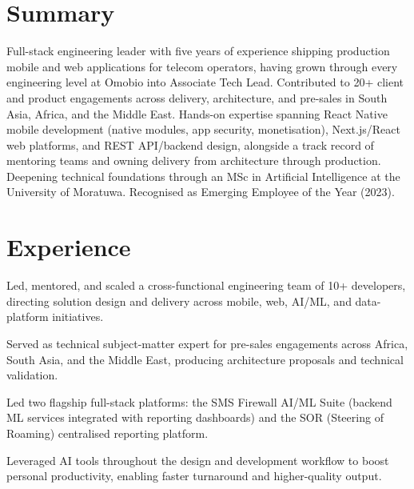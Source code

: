 \documentclass[10.5pt]{article}
\begin{document}

\section*{Summary}
Full-stack engineering leader with five years of experience shipping production mobile and web applications for telecom operators, having grown through every engineering level at Omobio into Associate Tech Lead. Contributed to 20+ client and product engagements across delivery, architecture, and pre-sales in South Asia, Africa, and the Middle East. Hands-on expertise spanning React Native mobile development (native modules, app security, monetisation), Next.js/React web platforms, and REST API/backend design, alongside a track record of mentoring teams and owning delivery from architecture through production. Deepening technical foundations through an MSc in Artificial Intelligence at the University of Moratuwa. Recognised as Emerging Employee of the Year (2023).

\section*{Experience}

\begin{cvitems}
  \item Led, mentored, and scaled a cross-functional engineering team of 10+ developers, directing solution design and delivery across mobile, web, AI/ML, and data-platform initiatives.
  \item Served as technical subject-matter expert for pre-sales engagements across Africa, South Asia, and the Middle East, producing architecture proposals and technical validation.
  \item Led two flagship full-stack platforms: the SMS Firewall AI/ML Suite (backend ML services integrated with reporting dashboards) and the SOR (Steering of Roaming) centralised reporting platform.
  \item Leveraged AI tools throughout the design and development workflow to boost personal productivity, enabling faster turnaround and higher-quality output.
\end{cvitems}
\end{document}
